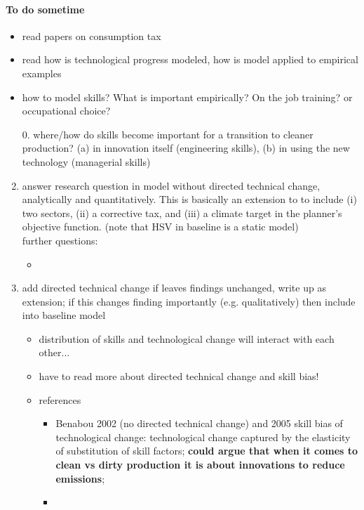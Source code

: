 \paragraph{To do sometime }
\begin{itemize}
	\item read papers on consumption tax
	\item read \cite{Acemoglu2002DirectedChange} \ar how is technological progress modeled, how is model applied to empirical examples
	\item how to model skills? What is important empirically? On the job training? or occupational choice?
\end{itemize}
\begin{enumerate}
	\item[0.] where/how do skills become important for a transition to cleaner production? (a) in innovation itself (engineering skills), (b) in using the new technology (managerial skills) \citep{Vona2018EnvironmentalExploration}
\item answer research question in model without directed technical change, analytically and quantitatively. This is basically an extension to \cite{Heathcote2017OptimalFramework} to include (i) two sectors, (ii) a corrective tax, and (iii) a climate target in the planner's objective function. (note that HSV in baseline is a static model)
\\ further questions: 
\begin{itemize}
	\item {}
\end{itemize}
\item add directed technical change \ar if leaves findings unchanged, write up as extension; if this changes finding importantly (e.g. qualitatively) then include into baseline model
\begin{itemize}
	\item distribution of skills and technological change will interact with each other... 
	\item have to read more about directed technical change and skill bias!
	\item references
\begin{itemize}
	\item Benabou 2002 (\ar no directed technical change) and 2005 \ar skill bias of technological change: technological change captured by the elasticity of substitution of skill factors; \textbf{could argue that when it comes to clean vs dirty production it is about innovations to reduce emissions}; 
	\item \cite{Acemoglu2002DirectedChange}
\end{itemize}
\end{itemize}
\end{enumerate}